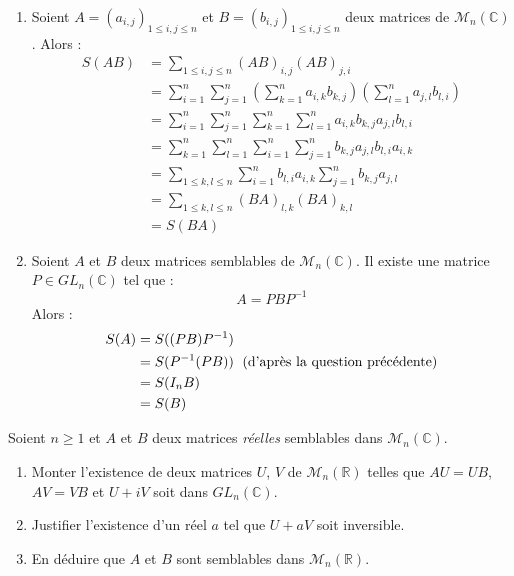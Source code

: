 \documentclass[a4paper,twoside,french,11pt]{VcCours}
\begin{document}
\begin{enumerate}
\item Soient $A=(a_{i,j})_{1 \leq i,j \leq n}$ et $B= (b_{i,j})_{1 \leq i,j \leq n}$  deux matrices de $\mathcal{M}_n(\mathbb{C})$. Alors :
\begin{align*}
S(AB) & =  \sum_{1 \leq i,j \leq n} (AB)_{i,j} (AB)_{j,i} \\
& = \sum_{i=1}^n \sum_{j=1}^n \left( \sum_{k=1}^n a_{i,k} b_{k,j} \right) \left( \sum_{l=1}^n a_{j,l} b_{l,i} \right) \\
& =  \sum_{i=1}^n \sum_{j=1}^n \sum_{k=1}^n \sum_{l=1}^n a_{i,k} b_{k,j} a_{j,l} b_{l,i} \\
& = \sum_{k=1}^n \sum_{l=1}^n \sum_{i=1}^n \sum_{j=1}^n b_{k,j} a_{j,l} b_{l,i} a_{i,k} \\
& = \sum_{1 \leq k,l \leq n} \sum_{i=1}^n  b_{l,i} a_{i,k}  \sum_{j=1}^n b_{k,j} a_{j,l} \\
& = \sum_{1 \leq k,l \leq n} (BA)_{l,k} (BA)_{k,l} \\
& = S(BA) 
\end{align*}
\item Soient $A$ et $B$ deux matrices semblables de $\mathcal{M}_n(\mathbb{C})$. Il existe une matrice $P \in GL_n(\mathbb{C})$ tel que :
$$ A=PBP^{-1}$$
Alors :
\begin{align*}
S(A) & = S((PB)P^{-1}) \\
& = S(P^{-1} (PB)) \; \hbox{ (d'après la question précédente)} \\
& = S(I_n B) \\
& = S(B)
\end{align*}
\end{enumerate}



\begin{Exercice}{} Soient $n \geq 1$ et $A$ et $B$ deux matrices \textit{réelles} semblables dans $\mathcal{M}_n(\mathbb{C})$.

\begin{enumerate}
\item Monter l'existence de deux matrices $U$, $V$ de $\mathcal{M}_n(\mathbb{R})$ telles que $AU=UB$, $AV=VB$ et $U+iV$ soit dans $GL_n(\mathbb{C})$.
\item Justifier l'existence d'un réel $a$ tel que $U+aV$ soit inversible.
\item En déduire que $A$ et $B$ sont semblables dans $\mathcal{M}_n(\mathbb{R})$.
\end{enumerate}
\end{Exercice} 
\end{document}
